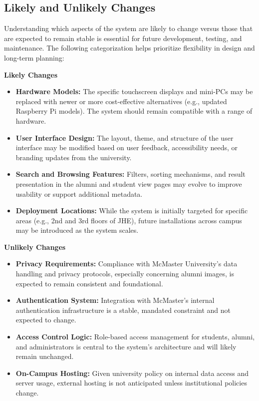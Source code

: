 \documentclass[12pt]{article}
\begin{document}
\subsection{Likely and Unlikely Changes}

Understanding which aspects of the system are likely to change versus those that are expected to remain stable is essential for future development, testing, and maintenance. The following categorization helps prioritize flexibility in design and long-term planning:

\textbf{Likely Changes}
\begin{itemize}
  \item \textbf{Hardware Models:} The specific touchscreen displays and mini-PCs may be replaced with newer or more cost-effective alternatives (e.g., updated Raspberry Pi models). The system should remain compatible with a range of hardware.
  \item \textbf{User Interface Design:} The layout, theme, and structure of the user interface may be modified based on user feedback, accessibility needs, or branding updates from the university.
  \item \textbf{Search and Browsing Features:} Filters, sorting mechanisms, and result presentation in the alumni and student view pages may evolve to improve usability or support additional metadata.
  \item \textbf{Deployment Locations:} While the system is initially targeted for specific areas (e.g., 2nd and 3rd floors of JHE), future installations across campus may be introduced as the system scales.
\end{itemize}

\textbf{Unlikely Changes}
\begin{itemize}
  \item \textbf{Privacy Requirements:} Compliance with McMaster University’s data handling and privacy protocols, especially concerning alumni images, is expected to remain consistent and foundational.
  \item \textbf{Authentication System:} Integration with McMaster’s internal authentication infrastructure is a stable, mandated constraint and not expected to change.
  \item \textbf{Access Control Logic:} Role-based access management for students, alumni, and administrators is central to the system’s architecture and will likely remain unchanged.
  \item \textbf{On-Campus Hosting:} Given university policy on internal data access and server usage, external hosting is not anticipated unless institutional policies change.
\end{itemize}
\end{document}
